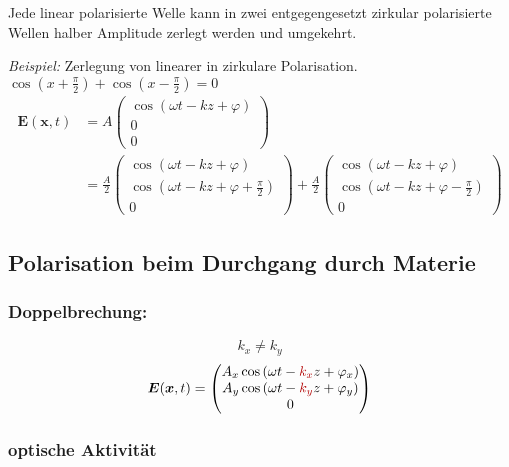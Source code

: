 \documentclass[titlepage,11pt,a4paper,ngerman]{report}
\renewcommand{\vec}[1]{\boldsymbol{#1}}
\newcommand{\rbox}[1]{\begin{tcolorbox}[colback=white,colframe=red!75!black]#1\end{tcolorbox}}
\begin{document}
\rbox{Jede linear polarisierte Welle kann in zwei entgegengesetzt zirkular polarisierte Wellen halber Amplitude zerlegt werden und umgekehrt.}
\noindent
\emph{Beispiel:} Zerlegung von linearer in zirkulare Polarisation.
$ \cos\left( x + \frac{\pi}{2}\right) + \cos\left( x - \frac{\pi}{2}\right) = 0 $
\begin{align*}
\vec{E}(\vec{x},t) &= A \begin{pmatrix}
\cos\left(\omega t - k z + \varphi\right) \\ 0 \\ 0
\end{pmatrix} \\
&= \frac{A}{2} \begin{pmatrix}
\cos\left(\omega t - k z + \varphi \right) \\ \cos\left(\omega t - k z + \varphi + \frac{\pi}{2}\right) \\ 0
\end{pmatrix} + \frac{A}{2} \begin{pmatrix}
\cos \left(\omega t - k z + \varphi\right) \\ \cos \left(\omega t -  k z + \varphi - \frac{\pi}{2}\right) \\ 0
\end{pmatrix}
\end{align*}

\subsection{Polarisation beim Durchgang durch Materie}

\subsubsection{Doppelbrechung:}

\begin{equation*}
k_x \neq k_y
\end{equation*}
\begin{equation*}
\vec{E}(\vec{x},t) = \begin{pmatrix}
A_x \cos\left(\omega t - \color{black!30!red}k_x\color{black}z + \varphi_x\right) \\ A_y \cos\left(\omega t - \color{black!30!red}k_y\color{black}z + \varphi_y \right) \\ 0
\end{pmatrix}
\end{equation*}

\subsubsection{optische Aktivität}
\end{document}
